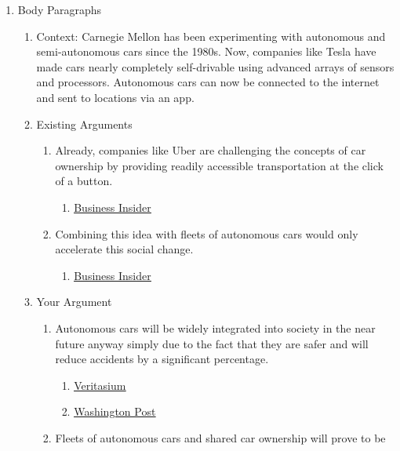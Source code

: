 \documentclass{article}
\begin{document}
\begin{enumerate}
\begin{enumerate}
  \end{enumerate}
  \item Body Paragraphs
  \begin{enumerate}
    \item Context: Carnegie Mellon has been experimenting with autonomous and
      semi-autonomous cars since the 1980s. Now, companies like Tesla have made
      cars nearly completely self-drivable using advanced arrays of sensors and
      processors. Autonomous cars can now be connected to the internet and sent
      to locations via an app.
    \item Existing Arguments
    \begin{enumerate}
      \item Already, companies like Uber are challenging the concepts of car
        ownership by providing readily accessible transportation at the click
        of a button.
      \begin{enumerate}
        \item \href{http://www.businessinsider.com/ubers-plans-to-be-cheaper-than-owning-a-car-2015-2}{\underline{Business Insider}}
      \end{enumerate}
      \item Combining this idea with fleets of autonomous cars would only
        accelerate this social change.
      \begin{enumerate}
        \item \href{http://www.businessinsider.com/former-tesla-vp-georg-bauer-autonomy-will-kill-car-ownership-2016-11}{\underline{Business Insider}}
      \end{enumerate}
    \end{enumerate}
    \item Your Argument
    \begin{enumerate}
      \item Autonomous cars will be widely integrated into society in the near
        future anyway simply due to the fact that they are safer and will reduce
        accidents by a significant percentage.
      \begin{enumerate}
        \item \href{https://www.youtube.com/watch?v=WBjY3QGNdAw}{\underline{Veritasium}}
        \item \href{https://www.washingtonpost.com/news/innovations/wp/2017/02/20/the-big-moral-dilemma-facing-self-driving-cars/?utm_term=.802ae11b67c4}{\underline{Washington Post}}
      \end{enumerate}
      \item Fleets of autonomous cars and shared car ownership will prove to be

\end{enumerate}
\end{enumerate}
\end{enumerate}
\end{document}

